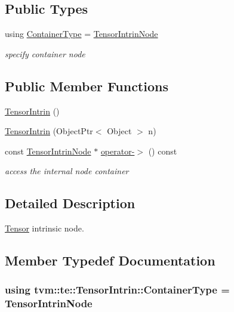 \subsection*{Public Types}
\begin{DoxyCompactItemize}
\item 
using \hyperlink{classtvm_1_1te_1_1TensorIntrin_ac7879e6d4dfd10a44423334871459a7b}{Container\+Type} = \hyperlink{classtvm_1_1te_1_1TensorIntrinNode}{Tensor\+Intrin\+Node}
\begin{DoxyCompactList}\small\item\em specify container node \end{DoxyCompactList}\end{DoxyCompactItemize}
\subsection*{Public Member Functions}
\begin{DoxyCompactItemize}
\item 
\hyperlink{classtvm_1_1te_1_1TensorIntrin_a24961182ef6710f04d76eb65d626ec72}{Tensor\+Intrin} ()
\item 
\hyperlink{classtvm_1_1te_1_1TensorIntrin_a07fb4c81adf8a37622e3f83086e60159}{Tensor\+Intrin} (Object\+Ptr$<$ Object $>$ n)
\item 
const \hyperlink{classtvm_1_1te_1_1TensorIntrinNode}{Tensor\+Intrin\+Node} $\ast$ \hyperlink{classtvm_1_1te_1_1TensorIntrin_a7f24683aa74591a7f1110a82e961134b}{operator-\/$>$} () const 
\begin{DoxyCompactList}\small\item\em access the internal node container \end{DoxyCompactList}\end{DoxyCompactItemize}


\subsection{Detailed Description}
\hyperlink{classtvm_1_1te_1_1Tensor}{Tensor} intrinsic node. 

\subsection{Member Typedef Documentation}
\subsubsection[{\texorpdfstring{Container\+Type}{ContainerType}}]{\setlength{\rightskip}{0pt plus 5cm}using {\bf tvm\+::te\+::\+Tensor\+Intrin\+::\+Container\+Type} =  {\bf Tensor\+Intrin\+Node}}\hypertarget{classtvm_1_1te_1_1TensorIntrin_ac7879e6d4dfd10a44423334871459a7b}{}\label{classtvm_1_1te_1_1TensorIntrin_ac7879e6d4dfd10a44423334871459a7b}


